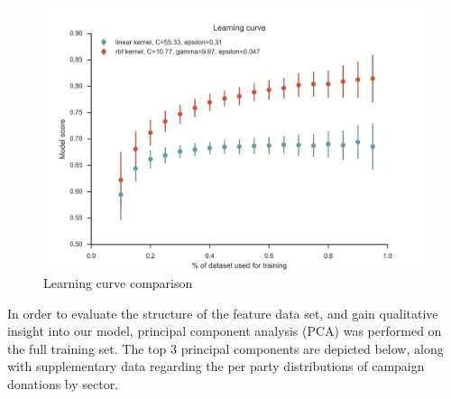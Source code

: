 \documentclass[12]{article}
\begin{document}
\begin{figure}[H]
\begin{center}
\includegraphics[width=0.8\linewidth]{learning_curve.png}
\caption{Learning curve comparison}
\end{center}
\end{figure}

In order to evaluate the structure of the feature data set, and gain qualitative 
insight into our model, principal component analysis (PCA) was performed on the 
full training set. The top 3 principal components are depicted below, along with 
supplementary data regarding the per party distributions of campaign donations 
by sector.
\end{document}

